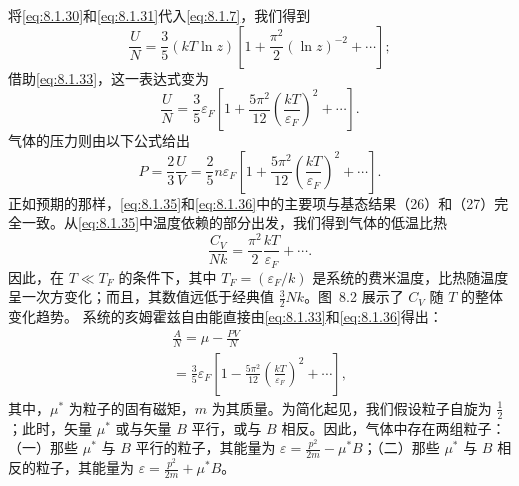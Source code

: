 将\autoref{eq:8.1.30}和\autoref{eq:8.1.31}代入\autoref{eq:8.1.7}，我们得到
\begin{equation}\tag{8.1.34}\label{eq:8.1.34}
\frac { U } { N } = \frac { 3 } { 5 } ( k T \ln z ) \left[ 1 + \frac { \pi ^{2} } { 2 } ( \ln z ) ^{- 2} + \cdots \right] ;
\end{equation}
借助\autoref{eq:8.1.33}，这一表达式变为
\begin{equation}\tag{8.1.35}\label{eq:8.1.35}
\frac { U } { N } = \frac { 3 } { 5 } \varepsilon _ { F } \left[ 1 + \frac { 5 \pi ^{2} } { 12 } \left( \frac { k T } { \varepsilon _ { F } } \right) ^{2} + \cdots \right] .
\end{equation}
气体的压力则由以下公式给出
\begin{equation}\tag{8.1.36}\label{eq:8.1.36}
P = \frac { 2 } { 3 } \frac { U } { V } = \frac { 2 } { 5 } n \varepsilon _ { F } \left[ 1 + \frac { 5 \pi ^{2} } { 12 } \left( \frac { k T } { \varepsilon _ { F } } \right) ^{2} + \cdots \right] .
\end{equation}
正如预期的那样，\autoref{eq:8.1.35}和\autoref{eq:8.1.36}中的主要项与基态结果（26）和（27）完全一致。从\autoref{eq:8.1.35}中温度依赖的部分出发，我们得到气体的低温比热
\begin{equation}\tag{8.1.37}\label{eq:8.1.37}
\frac { C _ { V } } { N k } = \frac { \pi ^{2} } { 2 } \frac { k T } { \varepsilon _ { F } } + \cdots .
\end{equation}
因此，在 \(T \ll T_{F}\) 的条件下，其中 \(T_{F}=(\varepsilon_{F}/k)\) 是系统的费米温度，比热随温度呈一次方变化；而且，其数值远低于经典值 \(\frac{3}{2}Nk\)。图~8.2 展示了 \(C_{V}\) 随 \(T\) 的整体变化趋势。
系统的亥姆霍兹自由能直接由\autoref{eq:8.1.33}和\autoref{eq:8.1.36}得出：
\begin{equation}\tag{8.1.38}\label{eq:8.1.38}
\begin{array}{r} { \frac { A } { N } = \mu - \frac { P V } { N } } \\{ = \frac { 3 } { 5 } \varepsilon _ { F } \left[ 1 - \frac { 5 \pi ^{2} } { 12 } \left( \frac { k T } { \varepsilon _ { F } } \right) ^{2} + \cdots \right] , } \end{array}
\end{equation}
其中，\(\mu^*\) 为粒子的固有磁矩，\(m\) 为其质量。为简化起见，我们假设粒子自旋为 \(\frac{1}{2}\)；此时，矢量 \(\mu^*\) 或与矢量 \(B\) 平行，或与 \(B\) 相反。因此，气体中存在两组粒子：
（一）那些 \(\mu^*\) 与 \(B\) 平行的粒子，其能量为 \(\varepsilon = \frac{p^2}{2m} - \mu^*B\)；（二）那些 \(\mu^*\) 与 \(B\) 相反的粒子，其能量为 \(\varepsilon = \frac{p^2}{2m} + \mu^*B\)。
